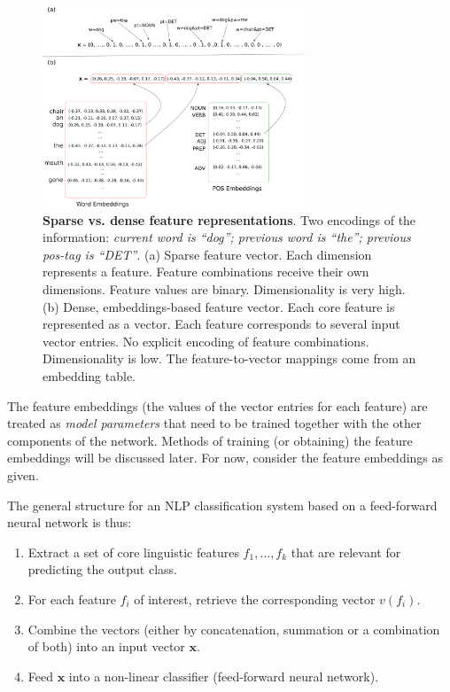 \documentclass[jair,twoside,11pt,theapa]{article}
\newcommand{\m}[1]{\mathbf{#1}}%
\begin{document}
{\begin{figure}[t]
\begin{center}
\includegraphics[width=0.7\textwidth]{feats.pdf}
\end{center}
\caption{\textbf{Sparse vs. dense feature representations}. 
Two encodings of the information: \emph{current word is ``dog''; previous word is ``the''; previous pos-tag is ``DET''}.
(a) Sparse feature vector.
Each dimension represents a feature. Feature combinations receive their own
dimensions. Feature values are binary. Dimensionality is very high.
(b) Dense, embeddings-based feature vector. Each core feature is represented as a
vector. Each feature corresponds to several input vector entries. No explicit
encoding of feature combinations. Dimensionality is low. The feature-to-vector
mappings come from an embedding table.}
\label{fig:sparse-vs-dense}
\end{figure}

The feature embeddings (the values of the vector entries for each feature) are treated as \emph{model
parameters} that need to be trained together with the other components of the
network. Methods of training (or obtaining) the feature embeddings will be
discussed later. For now, consider the feature embeddings as given.

The general structure for an NLP classification system based on a feed-forward neural network is thus: 
\begin{enumerate}
    \item Extract a set of core linguistic features $f_1,\dots,f_k$ that are relevant
        for predicting the output class.
    \item For each feature $f_i$ of interest, retrieve the corresponding vector $v(f_i)$. 
    \item Combine the vectors (either by concatenation, summation or a
        combination of both) into an input vector $\m{x}$.
    \item Feed $\m{x}$ into a non-linear classifier (feed-forward neural network).
\end{enumerate}

}
\end{document}
